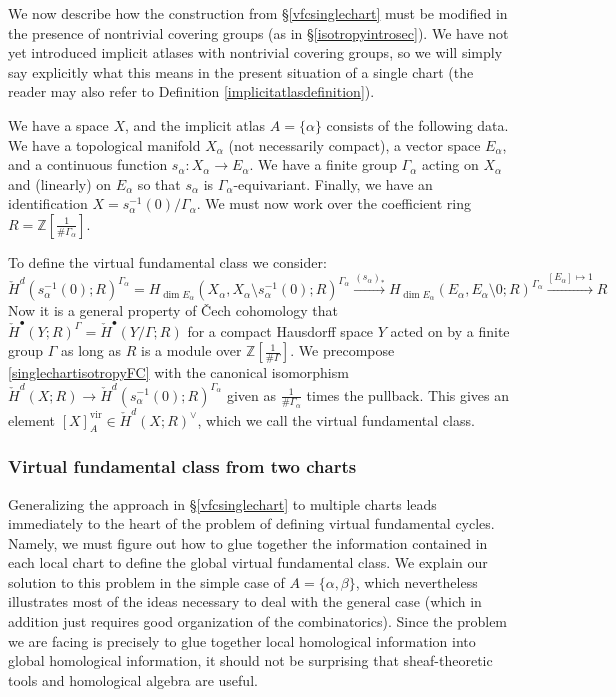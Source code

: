\documentclass[12pt]{article}
\theoremstyle{definition}
\theoremstyle{remark}
\numberwithin{equation}{subsection}
\newcommand{\ZZ}{\mathbb Z}
\newcommand{\cH}{\check H}
\newcommand{\vir}{\mathrm{vir}}
\begin{document}
We now describe how the construction from \S\ref{vfcsinglechart} must be modified in the presence of nontrivial covering groups (as in \S\ref{isotropyintrosec}).  We have not yet introduced implicit atlases with nontrivial covering groups, so we will simply say explicitly what this means in the present situation of a single chart (the reader may also refer to Definition \ref{implicitatlasdefinition}).

We have a space $X$, and the implicit atlas $A=\{\alpha\}$ consists of the following data.  We have a topological manifold $X_\alpha$ (not necessarily compact), a vector space $E_\alpha$, and a continuous function $s_\alpha:X_\alpha\to E_\alpha$.  We have a finite group $\Gamma_\alpha$ acting on $X_\alpha$ and (linearly) on $E_\alpha$ so that $s_\alpha$ is $\Gamma_\alpha$-equivariant.  Finally, we have an identification $X=s_\alpha^{-1}(0)/\Gamma_\alpha$.  We must now work over the coefficient ring $R=\ZZ[\frac 1{\#\Gamma_\alpha}]$.

To define the virtual fundamental class we consider:
\begin{equation}\label{singlechartisotropyFC}
\cH^d(s_\alpha^{-1}(0);R)^{\Gamma_\alpha}=H_{\dim E_\alpha}(X_\alpha,X_\alpha\setminus s_\alpha^{-1}(0);R)^{\Gamma_\alpha}\xrightarrow{(s_\alpha)_\ast}H_{\dim E_\alpha}(E_\alpha,E_\alpha\setminus 0;R)^{\Gamma_\alpha}\xrightarrow{[E_\alpha]\mapsto 1}R
\end{equation}
Now it is a general property of \v Cech cohomology that $\cH^\bullet(Y;R)^\Gamma=\cH^\bullet(Y/\Gamma;R)$ for a compact Hausdorff space $Y$ acted on by a finite group $\Gamma$ as long as $R$ is a module over $\ZZ[\frac 1{\#\Gamma}]$.  We precompose \eqref{singlechartisotropyFC} with the canonical isomorphism $\cH^d(X;R)\to\cH^d(s_\alpha^{-1}(0);R)^{\Gamma_\alpha}$ given as $\frac 1{\#\Gamma_\alpha}$ times the pullback.  This gives an element $[X]_A^\vir\in\cH^d(X;R)^\vee$, which we call the virtual fundamental class.

\subsubsection{Virtual fundamental class from two charts}\label{vfcmultiplecharts}

Generalizing the approach in \S\ref{vfcsinglechart} to multiple charts leads immediately to the heart of the problem of defining virtual fundamental cycles.  Namely, we must figure out how to glue together the information contained in each local chart to define the global virtual fundamental class.  We explain our solution to this problem in the simple case of $A=\{\alpha,\beta\}$, which nevertheless illustrates most of the ideas necessary to deal with the general case (which in addition just requires good organization of the combinatorics).  Since the problem we are facing is precisely to glue together local homological information into global homological information, it should not be surprising that sheaf-theoretic tools and homological algebra are useful.
\end{document}
